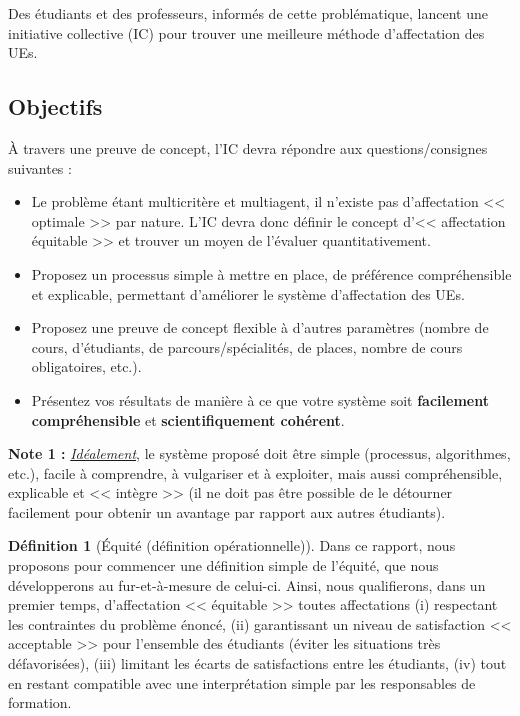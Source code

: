 \documentclass{rapport}
\theoremstyle{definition}
\newtheorem{definition}{Définition}
\theoremstyle{remark}
\theoremstyle{plain}
\theoremstyle{definition}
\theoremstyle{definition}
\theoremstyle{remark}
\theoremstyle{definition}
\begin{document}
Des étudiants et des professeurs, informés de cette problématique, lancent une initiative collective (IC) pour trouver une meilleure méthode d'affectation des UEs.

\subsection{Objectifs}
À travers une preuve de concept, l'IC devra répondre aux questions/consignes suivantes :
\begin{itemize}
    \item Le problème étant multicritère et multiagent, il n'existe pas d'affectation << optimale >> par nature. L'IC devra donc définir le concept d'<< affectation équitable >> et trouver un moyen de l'évaluer quantitativement.
    \item Proposez un processus simple à mettre en place, de préférence compréhensible et explicable, permettant d'améliorer le système d'affectation des UEs.
    \item Proposez une preuve de concept flexible à d'autres paramètres (nombre de cours, d'étudiants, de parcours/spécialités, de places, nombre de cours obligatoires, etc.).
    \item Présentez vos résultats de manière à ce que votre système soit \textbf{facilement compréhensible} et \textbf{scientifiquement cohérent}.
\end{itemize}
\textbf{Note 1 :} \underline{\textit{Idéalement}}, le système proposé doit être simple (processus, algorithmes, etc.), facile à comprendre, à vulgariser et à exploiter, mais aussi compréhensible, explicable et << intègre >> (il ne doit pas être possible de le détourner facilement pour obtenir un avantage par rapport aux autres étudiants).

\begin{definition}[Équité (définition opérationnelle)]
    Dans ce rapport, nous proposons pour commencer une définition simple de l'équité, que nous développerons au fur-et-à-mesure de celui-ci. Ainsi, nous qualifierons, dans un premier temps, d'affectation << équitable >> toutes affectations (i) respectant les contraintes du problème énoncé, (ii) garantissant un niveau de satisfaction << acceptable >> pour l'ensemble des étudiants (éviter les situations très défavorisées), (iii) limitant les écarts de satisfactions entre les étudiants, (iv) tout en restant compatible avec une interprétation simple par les responsables de formation.
\end{definition}
\end{document}
